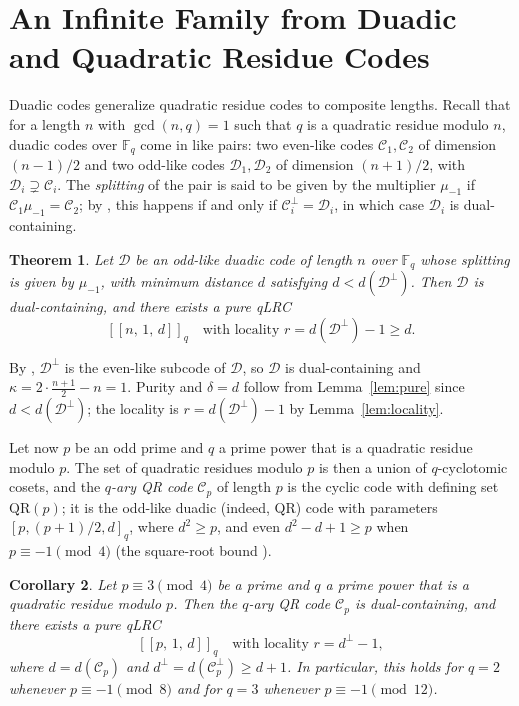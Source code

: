 \documentclass[journal,onecolumn]{IEEEtran}
\newtheorem{thm}{Theorem}
\newtheorem{cor}[thm]{Corollary}
\newcommand{\Ff}{{\mathbb F}}
\newcommand{\cc}{{\mathcal C}}
\newcommand{\cD}{{\mathcal D}}
\newcommand{\dsb}[1]{[\![#1]\!]}
\begin{document}
\section{An Infinite Family from Duadic and Quadratic Residue Codes}\label{sec:QR}

Duadic codes \cite{Leon1984} generalize quadratic residue codes to composite lengths. Recall that for a length $n$ with $\gcd(n,q)=1$ such that $q$ is a quadratic residue modulo $n$, duadic codes over $\Ff_q$ come in like pairs: two even-like codes $\cc_1,\cc_2$ of dimension $(n-1)/2$ and two odd-like codes $\cD_1,\cD_2$ of dimension $(n+1)/2$, with $\cD_i\supsetneq\cc_i$. The \emph{splitting} of the pair is said to be given by the multiplier $\mu_{-1}$ if $\cc_1\mu_{-1}=\cc_2$; by \cite[Theorem~6.4.2]{Huffman2003}, this happens if and only if $\cc_i^\perp=\cD_i$, in which case $\cD_i$ is dual-containing.

\begin{thm}\label{thm:duadic}
Let $\cD$ be an odd-like duadic code of length $n$ over $\Ff_q$ whose splitting is given by $\mu_{-1}$, with minimum distance $d$ satisfying $d<d(\cD^\perp)$. Then $\cD$ is dual-containing, and there exists a pure qLRC
\[
\dsb{n,\,1,\,d}_q \quad\text{with locality } r=d(\cD^\perp)-1\ge d.
\]
\end{thm}

\begin{IEEEproof}
By \cite[Theorem~6.4.2]{Huffman2003}, $\cD^\perp$ is the even-like subcode of $\cD$, so $\cD$ is dual-containing and $\kappa=2\cdot\frac{n+1}{2}-n=1$. Purity and $\delta=d$ follow from Lemma~\ref{lem:pure} since $d<d(\cD^\perp)$; the locality is $r=d(\cD^\perp)-1$ by Lemma~\ref{lem:locality}.
\end{IEEEproof}

Let now $p$ be an odd prime and $q$ a prime power that is a quadratic residue modulo $p$. The set of quadratic residues modulo $p$ is then a union of $q$-cyclotomic cosets, and the \emph{$q$-ary QR code} $\cc_p$ of length $p$ is the cyclic code with defining set $\mathrm{QR}(p)$; it is the odd-like duadic (indeed, QR) code with parameters $[p,(p+1)/2,d]_q$, where $d^2\ge p$, and even $d^2-d+1\ge p$ when $p\equiv-1\pmod 4$ (the square-root bound \cite[Theorem~6.6.22]{Huffman2003}).

\begin{cor}\label{cor:QR}
Let $p\equiv 3 \pmod 4$ be a prime and $q$ a prime power that is a quadratic residue modulo $p$. Then the $q$-ary QR code $\cc_p$ is dual-containing, and there exists a pure qLRC
\[
\dsb{p,\,1,\,d}_q \quad\text{with locality } r=d^\perp-1,
\]
where $d=d(\cc_p)$ and $d^\perp=d(\cc_p^\perp)\ge d+1$. In particular, this holds for $q=2$ whenever $p\equiv -1\pmod 8$ and for $q=3$ whenever $p\equiv -1\pmod{12}$.
\end{cor}
\end{document}
